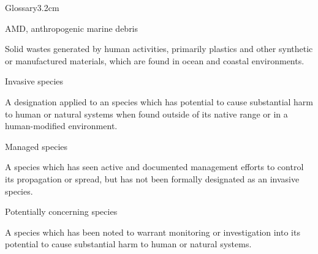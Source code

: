 \documentclass[a4paper, nobind]{templates/ociamthesis}
\begin{document}
\begin{romanpages}
  \dominitoc %

\flushbottom

\tableofcontents

\listoffigures
	\mtcaddchapter

\listoftables
  \mtcaddchapter
\begin{mclistof}{Glossary}{3.2cm}

\item[AMD, anthropogenic marine debris]

Solid wastes generated by human activities, primarily plastics and other synthetic or manufactured materials, which are found in ocean and coastal environments.

\item[Invasive species]

A designation applied to an species which has potential to cause substantial harm to human or natural systems when found outside of its native range or in a human-modified environment.

\item[Managed species]

A species which has seen active and documented management efforts to control its propagation or spread, but has not been formally designated as an invasive species.

\item[Potentially concerning species]

A species which has been noted to warrant monitoring or investigation into its potential to cause substantial harm to human or natural systems.

\end{mclistof} 


\end{romanpages}
\end{document}
